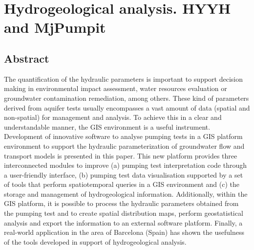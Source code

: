 
\chapter{Hydrogeological analysis. HYYH and MjPumpit}  %

\ifpdf
    \graphicspath{{Chapter1/Figs/Raster/}{Chapter1/Figs/PDF/}{Chapter1/Figs/}}
\else
    \graphicspath{{Chapter1/Figs/Vector/}{Chapter1/Figs/}}
\fi


\section{Abstract} %
The quantification of the hydraulic parameters is important to support decision making in environmental impact assessment, water resources evaluation or groundwater contamination remediation, among others. These kind of parameters derived from aquifer tests usually encompasses a vast amount of data (spatial and non-spatial) for management and analysis. To achieve this in a clear and understandable manner, the GIS environment is a useful instrument. Development of innovative software to analyse pumping tests in a GIS platform environment to support the hydraulic parameterization of groundwater flow and transport models is presented in this paper. This new platform provides three interconnected modules to improve (a) pumping test interpretation code through a user-friendly interface, (b) pumping test data visualisation supported by a set of tools that perform spatiotemporal queries in a GIS environment and (c) the storage and management of hydrogeological information. Additionally, within the GIS platform, it is possible to process the hydraulic parameters obtained from the pumping test and to create spatial distribution maps, perform geostatistical analysis and export the information to an external software platform. Finally, a real-world application in the area of Barcelona (Spain) has shown the usefulness of the tools developed in support of hydrogeological analysis.


